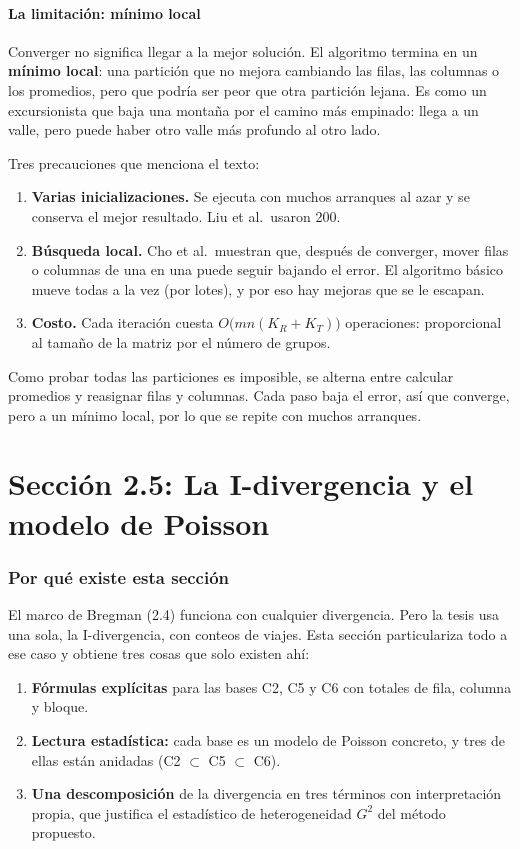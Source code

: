 \documentclass[11pt,a4paper]{article}
\newenvironment{idea}{\par\begin{center}\begin{lrbox}{\ideabox}\begin{minipage}{0.9\linewidth}}{\end{minipage}\end{lrbox}\fcolorbox{blue!40!black}{blue!5}{\usebox{\ideabox}}\end{center}}
\begin{document}
\subsection{La limitación: mínimo local}

Converger no significa llegar a la mejor solución. El algoritmo termina en un
\textbf{mínimo local}: una partición que no mejora cambiando las filas, las
columnas o los promedios, pero que podría ser peor que otra partición lejana. Es
como un excursionista que baja una montaña por el camino más empinado: llega a un
valle, pero puede haber otro valle más profundo al otro lado.

Tres precauciones que menciona el texto:
\begin{enumerate}
  \item \textbf{Varias inicializaciones.} Se ejecuta con muchos arranques al azar
  y se conserva el mejor resultado. Liu et al.\ usaron 200.
  \item \textbf{Búsqueda local.} Cho et al.\ muestran que, después de converger,
  mover filas o columnas de una en una puede seguir bajando el error. El algoritmo
  básico mueve todas a la vez (por lotes), y por eso hay mejoras que se le
  escapan.
  \item \textbf{Costo.} Cada iteración cuesta $O\bigl(mn(K_R+K_T)\bigr)$
  operaciones: proporcional al tamaño de la matriz por el número de grupos.
\end{enumerate}

\begin{idea}
Como probar todas las particiones es imposible, se alterna entre calcular
promedios y reasignar filas y columnas. Cada paso baja el error, así que converge,
pero a un mínimo local, por lo que se repite con muchos arranques.
\end{idea}

\part{Sección 2.5: La I-divergencia y el modelo de Poisson}

\section{Por qué existe esta sección}

El marco de Bregman (2.4) funciona con cualquier divergencia. Pero la tesis usa una
sola, la I-divergencia, con conteos de viajes. Esta sección particulariza todo a
ese caso y obtiene tres cosas que solo existen ahí:
\begin{enumerate}
  \item \textbf{Fórmulas explícitas} para las bases C2, C5 y C6 con totales de
  fila, columna y bloque.
  \item \textbf{Lectura estadística:} cada base es un modelo de Poisson concreto,
  y tres de ellas están anidadas (C2 $\subset$ C5 $\subset$ C6).
  \item \textbf{Una descomposición} de la divergencia en tres términos con
  interpretación propia, que justifica el estadístico de heterogeneidad $G^2$ del
  método propuesto.
\end{enumerate}
\end{document}
